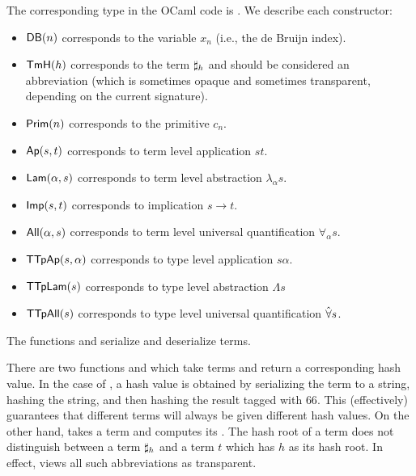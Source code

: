 The corresponding type in the OCaml code is {}.
We describe each constructor:
\begin{itemize}
\item ${\mbox{\constr{DB}}}(n)$ corresponds to the variable $x_n$  (i.e., the de Bruijn index).
\item ${\mbox{\constr{TmH}}}(h)$ corresponds to the term $\mathbf{\sharp}_{h}$
and should be considered an abbreviation (which is sometimes opaque and sometimes transparent, depending on the current signature).
\item ${\mbox{\constr{Prim}}}(n)$ corresponds to the primitive $c_n$.
\item ${\mbox{\constr{Ap}}}(s,t)$ corresponds to term level application $st$.
\item ${\mbox{\constr{Lam}}}(\alpha,s)$ corresponds to term level abstraction $\lambda_\alpha s$.
\item ${\mbox{\constr{Imp}}}(s,t)$ corresponds to implication $s\to t$.
\item ${\mbox{\constr{All}}}(\alpha,s)$ corresponds to term level universal quantification $\forall_\alpha s$.
\item ${\mbox{\constr{TTpAp}}}(s,\alpha)$ corresponds to type level application $s\alpha$.
\item ${\mbox{\constr{TTpLam}}}(s)$ corresponds to type level abstraction $\Lambda s$
\item ${\mbox{\constr{TTpAll}}}(s)$ corresponds to type level universal quantification $\hat{\forall} s$.
\end{itemize}

The functions {} and {} serialize and deserialize terms.

There are two functions {} 
and
{} which take terms and return
a corresponding hash value.
In the case of {},
a hash value is obtained by serializing the term
to a string, hashing the string, and then hashing the result tagged with $66$.
This (effectively) guarantees that different terms
will always be given different hash values.
On the other hand, {} takes a term and computes its {}.
The hash root of a term does not distinguish between a term
$\mathbf{\sharp}_{h}$ and a term $t$ which has $h$ as its hash root.
In effect, {} views all such abbreviations
as transparent.

